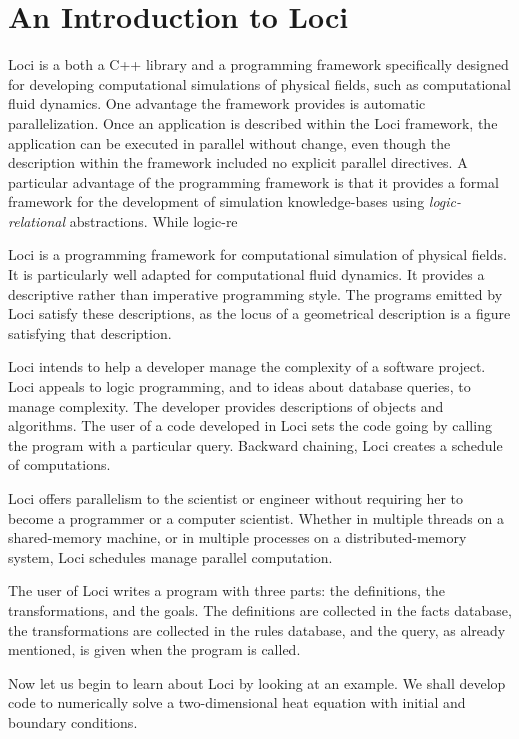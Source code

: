 \chapter{An Introduction to Loci}

Loci is a both a C++ library and a programming framework specifically
designed for developing computational simulations of physical fields,
such as computational fluid dynamics.  One advantage the framework
provides is automatic parallelization.  Once an application is
described within the Loci framework, the application can be executed
in parallel without change, even though the description within the
framework included no explicit parallel directives.  A particular
advantage of the programming framework is that it provides a formal
framework for the development of simulation knowledge-bases using {\em logic-relational} abstractions.  While logic-re

Loci is a programming framework
for computational simulation of physical fields.  It is particularly
well adapted for computational fluid dynamics.  It provides a
descriptive rather than imperative programming style.  The programs
emitted by Loci satisfy these descriptions, as the locus of a
geometrical description is a figure satisfying that description.

Loci intends to help a developer manage the complexity of a software
project.  Loci appeals to logic programming, and to ideas about
database queries, to manage complexity.  The developer provides
descriptions of objects and algorithms.  The user of a code developed
in Loci sets the code going by calling the program with a particular
query.  Backward chaining, Loci creates a schedule of computations.

Loci offers parallelism to the scientist or engineer without requiring
her to become a programmer or a computer scientist.  Whether in
multiple threads on a shared-memory machine, or in multiple processes
on a distributed-memory system, Loci schedules manage parallel
computation.

The user of Loci writes a program with three parts:  the definitions,
the transformations, and the goals.  The definitions are collected in
the facts database, the transformations are collected in the rules
database, and the query, as already mentioned, is given when the
program is called.

Now let us begin to learn about Loci by looking at an example.  We
shall develop code to numerically solve a two-dimensional heat
equation with initial and boundary conditions.

